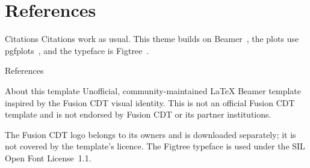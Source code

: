 \documentclass[aspectratio=169, 11pt]{beamer}
\begin{document}
\section{References}

\begin{frame}{Citations}
  Citations work as usual. This theme builds on Beamer~\cite{beamer}, the
  plots use pgfplots~\cite{pgfplots}, and the typeface is
  Figtree~\cite{figtree}.
\end{frame}

\begin{frame}{References}
  \footnotesize
  
  
\end{frame}

\begin{frame}{About this template}
  \footnotesize
  Unofficial, community-maintained LaTeX Beamer template inspired by the
  Fusion CDT visual identity. This is not an official Fusion CDT template and
  is not endorsed by Fusion CDT or its partner institutions.

  \medskip
  The Fusion CDT logo belongs to its owners and is downloaded separately; it
  is not covered by the template's licence. The Figtree typeface is used under
  the SIL Open Font License~1.1.
\end{frame}

\end{document}
